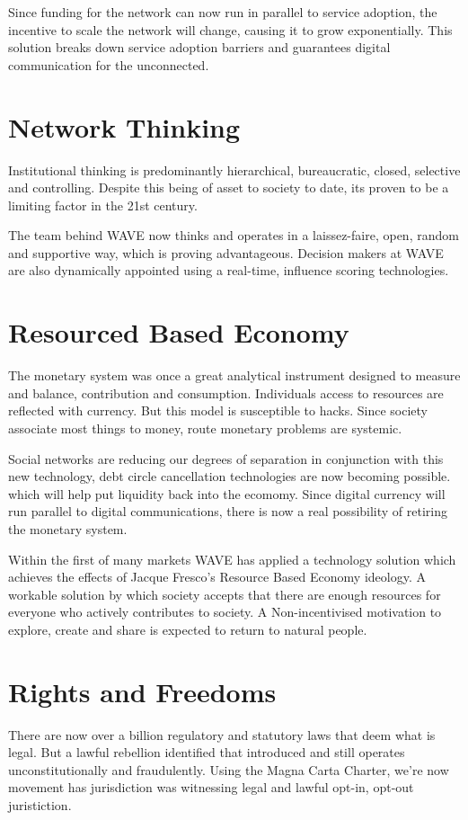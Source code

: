 \documentclass[letterpaper,10pt,openany,oneside,english]{sphinxmanual}
\begin{document}
Since funding for the network can now run in parallel to service adoption, the incentive to scale the network will change, causing it to grow exponentially. This solution breaks down service adoption barriers and guarantees digital communication for the unconnected.


\chapter{Network Thinking}
\label{\detokenize{network-thinking:network-thinking}}\label{\detokenize{network-thinking::doc}}
Institutional thinking is predominantly hierarchical, bureaucratic, closed, selective and controlling. Despite this being of asset to society to date, its proven to be a limiting factor in the 21st century.

The team behind WAVE now thinks and operates in a laissez-faire, open, random and supportive way, which is proving advantageous. Decision makers at WAVE are also dynamically appointed using a real-time, influence scoring technologies.


\chapter{Resourced Based Economy}
\label{\detokenize{resource-based-economy:resourced-based-economy}}\label{\detokenize{resource-based-economy::doc}}
The monetary system was once a great analytical instrument designed to measure and balance, contribution and consumption. Individuals access to resources are reflected with currency. But this model is susceptible to hacks. Since society associate most things to money, route monetary problems are systemic.

Social networks are reducing our degrees of separation in conjunction with this new technology, debt circle cancellation technologies are now becoming possible. which will help put liquidity back into the ecomomy. Since digital currency will run parallel to digital communications, there is now a real possibility of retiring the monetary system.

Within the first of many markets WAVE has applied a technology solution which achieves the effects of Jacque Fresco’s Resource Based Economy ideology. A workable solution by which society accepts that there are enough resources for everyone who actively contributes to society. A Non-incentivised motivation to explore, create and share is expected to return to natural people.


\chapter{Rights and Freedoms}
\label{\detokenize{rights-freedoms:rights-and-freedoms}}\label{\detokenize{rights-freedoms::doc}}
There are now over a billion regulatory and statutory laws that deem what is legal. But a lawful rebellion identified that introduced and still operates unconstitutionally and fraudulently. Using the Magna Carta Charter, we’re now movement has jurisdiction was witnessing legal and lawful opt-in, opt-out juristiction.
\end{document}
